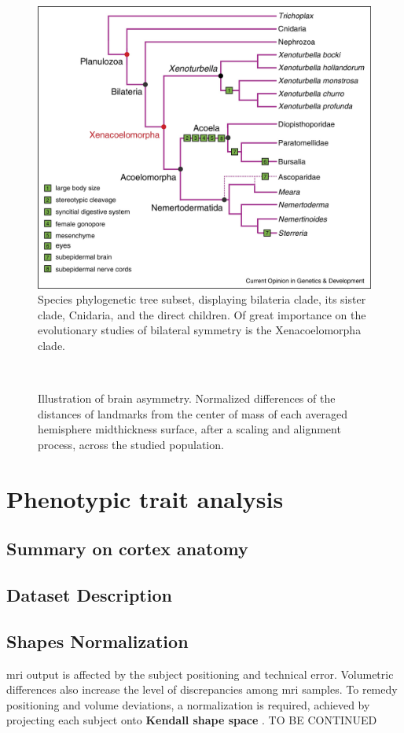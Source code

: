 \begin{figure}
	\centering
	\includegraphics[width=0.7\linewidth]{bilateria_phylum}
	\caption[Bilateria clade \cite{Hejnol2016}]{Species phylogenetic tree subset, displaying bilateria clade, its sister clade, Cnidaria, and the direct children\cite{Hejnol2016}. Of great importance on the evolutionary studies of bilateral symmetry is the Xenacoelomorpha clade.}
	\label{fig:bilateriaphylum}
\end{figure}

\begin{figure}
	\centering
	\\
	\caption[Illustration of brain asymmetry]{Illustration of brain asymmetry. Normalized differences of the distances of landmarks from the center of mass of each averaged hemisphere midthickness surface, after a scaling and alignment process, across the studied population.}
	\label{fig:brainlat}
\end{figure}

\section{Phenotypic trait analysis}
\subsection{Summary on cortex anatomy}
 
\subsection{Dataset Description}
 
\subsection{Shapes Normalization}
\Ac{mri} output is affected by the subject positioning and technical error.  Volumetric differences also increase the level of discrepancies among \ac{mri} samples. To remedy positioning and volume deviations, a normalization is required, achieved by projecting each subject onto \textbf{Kendall shape space} \cite{Klingenberg2020}. TO BE CONTINUED

